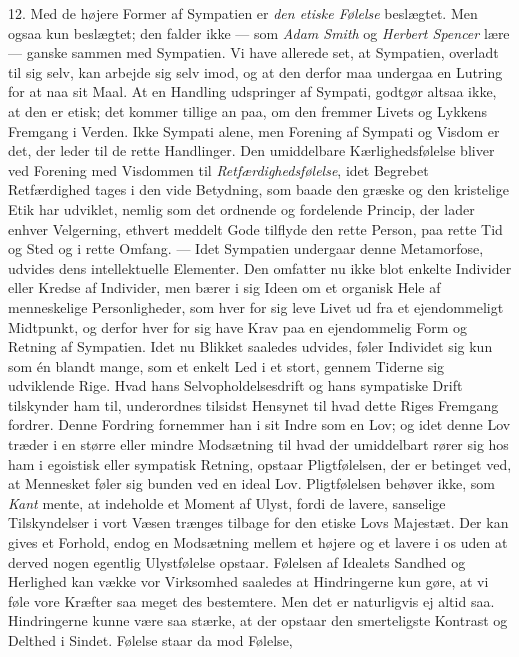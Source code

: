 \documentclass[12pt,a4paper,openany]{book}
\newcommand{\opage}[1]{\marginnote{\footnotesize\textit{[#1]}}}
\begin{document}
12. Med de højere Former af Sympatien er \emph{den etiske Følelse}
beslægtet. Men ogsaa kun beslægtet; den falder ikke ---
\opage{310}som \emph{Adam Smith} og \emph{Herbert Spencer} lære ---
ganske sammen med Sympatien. Vi have allerede set, at Sympatien,
overladt til sig selv, kan arbejde sig selv imod, og at den derfor maa
undergaa en Lutring for at naa sit Maal. At en Handling udspringer af
Sympati, godtgør altsaa ikke, at den er etisk; det kommer tillige an
paa, om den fremmer Livets og Lykkens Fremgang i Verden. Ikke Sympati
alene, men Forening af Sympati og Visdom er det, der leder til de rette
Handlinger. Den umiddelbare Kærlighedsfølelse bliver ved Forening med
Visdommen til \emph{Retfærdighedsfølelse}, idet Begrebet Retfærdighed
tages i den vide Betydning, som baade den græske og den kristelige Etik
har udviklet, nemlig som det ordnende og fordelende Princip, der lader
enhver Velgerning, ethvert meddelt Gode tilflyde den rette Person, paa
rette Tid og Sted og i rette Omfang. --- Idet Sympatien undergaar denne
Metamorfose, udvides dens intellektuelle Elementer. Den omfatter nu ikke
blot enkelte Individer eller Kredse af Individer, men bærer i sig Ideen
om et organisk Hele af menneskelige Personligheder, som hver for sig
leve Livet ud fra et ejendommeligt Midtpunkt, og derfor hver for sig
have Krav paa en ejendommelig Form og Retning af Sympatien. Idet nu
Blikket saaledes udvides, føler Individet sig kun som én blandt mange,
som et enkelt Led i et stort, gennem Tiderne sig udviklende Rige. Hvad
hans Selvopholdelsesdrift og hans sympatiske Drift tilskynder ham til,
underordnes tilsidst Hensynet til hvad dette Riges Fremgang fordrer.
Denne Fordring fornemmer han i sit Indre som en Lov; og idet denne Lov
træder i en større eller mindre Modsætning til hvad der umiddelbart
rører sig hos ham i egoistisk eller sympatisk Retning, opstaar
Pligtfølelsen, der er betinget ved, at Mennesket føler sig bunden ved en
ideal Lov. Pligtfølelsen behøver ikke, som \emph{Kant} mente, at
indeholde et Moment af Ulyst, fordi de lavere, sanselige Tilskyndelser i
vort Væsen trænges tilbage for den etiske Lovs Majestæt. Der kan gives
et Forhold, endog en Modsætning mellem et højere og et lavere i os uden
at derved nogen egentlig Ulystfølelse opstaar. Følelsen af Idealets
Sandhed og Herlighed kan vække vor Virksomhed saaledes at Hindringerne
kun gøre, at vi føle vore Kræfter saa meget des bestemtere. Men det er
naturligvis ej altid saa.
\opage{311}Hindringerne kunne være saa stærke, at der opstaar den
smerteligste Kontrast og Delthed i Sindet. Følelse staar da mod Følelse,
\end{document}
